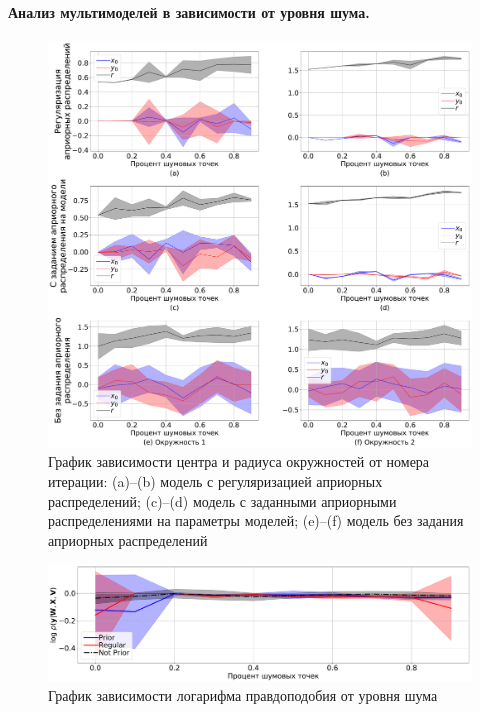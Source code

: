 \documentclass[12pt, twoside]{article}
\numberwithin{equation}{section}
\begin{document}
\paragraph{Анализ мультимоделей в зависимости от уровня шума.} 
\begin{figure}[h!t]\center
\includegraphics[width=1\textwidth]{result/experiment_synthetic_param_progress_noise}
\caption{График зависимости центра и радиуса окружностей от номера итерации: (a)--(b) модель с регуляризацией априорных распределений; (c)--(d) модель с заданными априорными распределениями на параметры моделей; (e)--(f) модель без задания априорных распределений}
\label{experiment:st:3:1}
\end{figure}

\begin{figure}[h!t]\center
\includegraphics[width=1\textwidth]{result/experiment_synt_likelihood_progress_noise}
\caption{График зависимости логарифма правдоподобия от уровня шума}
\label{experiment:st:3:2}
\end{figure}
\end{document}
